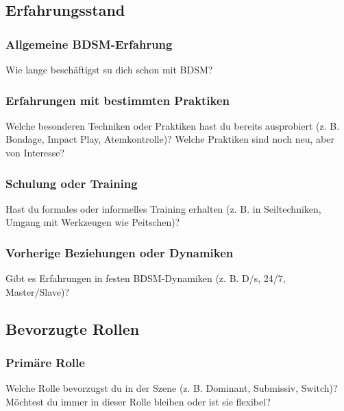 \documentclass[a4paper,12pt]{article}
\begin{document}
\subsection{Erfahrungsstand}
\subsubsection{Allgemeine BDSM-Erfahrung}
Wie lange beschäftigst su dich schon mit BDSM?\bigbreak
\begin{Form}
\end{Form}
\newline

\subsubsection{Erfahrungen mit bestimmten Praktiken}
\noindent Welche besonderen Techniken oder Praktiken hast du bereits ausprobiert (z. B. Bondage, Impact Play, Atemkontrolle)? Welche Praktiken sind noch neu, aber von Interesse? \newline
\noindent \TextField[name=ErfahrungPraktiken,multiline=true,height=7em, width=37em]{}

\subsubsection{Schulung oder Training}
\noindent Hast du formales oder informelles Training erhalten (z. B. in Seiltechniken, Umgang mit Werkzeugen wie Peitschen)? \newline
\noindent \TextField[name=ErfahrungTraining,multiline=true,height=7em, width=37em]{}

\subsubsection{Vorherige Beziehungen oder Dynamiken}
\noindent Gibt es Erfahrungen in festen BDSM-Dynamiken (z. B. D/s, 24/7, Master/Slave)? \newline
\noindent \TextField[name=ErfahrungDynamiken,multiline=true,height=7em, width=37em]{}

\newpage
\subsection{Bevorzugte Rollen}
\subsubsection{Primäre Rolle}
\noindent Welche Rolle bevorzugst du in der Szene (z. B. Dominant, Submissiv, Switch)? Möchtest du immer in dieser Rolle bleiben oder ist sie flexibel?\newline
\noindent \TextField[name=ErfahrungPrefRolle,multiline=true,height=7em, width=37em]{}
\end{document}
